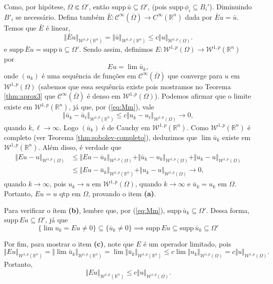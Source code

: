 \documentclass[a4paper, 11pt]{book}
\theoremstyle{definition}
\newcommand{\bR}{\mathbb{R}}
\newcommand{\cC}{\mathcal{C}}
\newcommand{\cW}{\mathcal{W}}
\newcommand{\supp}{\mathrm{supp}\,}
\begin{document}
\begin{prf}
    Como, por hipótese, $\Omega \Subset \Omega'$, então $\supp \bar u \subseteq \Omega'$, (pois $\supp \phi_i \subseteq B_i'$). Diminuindo $B'_i$ se necessário.
    Defina também $\bar E: \cC^\infty(\overline\Omega) \to C^\infty(\bR^n)$ dada por $\bar E u = \bar u$.
    Temos que $\bar E$ é linear,
    \[
        \Vert \bar E u \Vert_{\cW^{1,p}(\bR^n)} = \Vert \bar u \Vert_{\cW^{1,p}(\bR^n)} \leqslant c \Vert u \Vert_{\cW^{1,p}(\Omega)}.
    \]
    e $\supp \bar E u  = \supp \bar u \subseteq \Omega'.$
    Sendo assim, definimos $E : \cW^{1,p}(\Omega) \to \cW^{1,p}(\bR^n)$ por
    \[
        Eu = \lim \bar u_k,
    \]
    onde $(u_k)$ é uma sequência de funções em $\cC^\infty(\overline\Omega)$ que converge para $u$ em $\cW^{1,p}(\Omega)$ (sabemos que essa sequência existe pois mostramos no Teorema \ref{thm:aprox3} que $\cC^\infty(\overline\Omega)$ é denso em $\cW^{1,p}(\Omega)$).
    Podemos afirmar que o limite existe em $\cW^{1,p}(\bR^n)$, já que, por (\ref{eq:Mm}), vale
    \[
        \Vert \bar u_k - \bar u_\ell \Vert_{\cW^{1,p}(\bR^n)} \leqslant c \Vert u_k - u_\ell \Vert_{\cW^{1,p}(\Omega)} \to 0,
    \]
    quando $k,\ell \to \infty$.
    Logo $(\bar u_k)$ é de Cauchy em $\cW^{1,p}(\bR^n)$.
    Como $\cW^{1,p}(\bR^n)$ é completo (ver Teorema \ref{thm:sobolev-completo}), deduzimos que $\lim \bar u_k$ existe em $\cW^{1,p}(\bR^n)$.
    Além disso, é verdade que
    \[
        \begin{aligned}
            \Vert Eu - u \Vert_{\cW^{1,p}(\Omega)} &\leqslant \Vert Eu - \bar u_k \Vert_{\cW^{1,p}(\Omega)} + \Vert \bar u_k - u_k \Vert_{\cW^{1,p}(\Omega)} + \Vert u_k - u\Vert_{\cW^{1,p}(\Omega)}\\
            &\leqslant \Vert Eu - \bar u_k \Vert_{\cW^{1,p}(\bR^n)} + \Vert u_k - u \Vert_{\cW^{1,p}(\Omega)} \to 0,
        \end{aligned}
    \]
    quando $k \to \infty$,
    pois $u_k \to u$ em $\cW^{1,p}(\Omega)$, quando $k \to \infty$ e $\bar u_k = u_k$ em $\Omega$.
    Portanto, $Eu = u$ qtp em $\Omega$, provando o item \textbf{(a)}.

    Para verificar o ítem \textbf{(b)}, lembre que, por (\ref{eq:Mm}), $\supp \bar u_k \subseteq \Omega'$.
    Dessa forma, $\supp Eu \subseteq \Omega'$, já que
    \[
        \{ \lim u_k = Eu \neq 0\} \subseteq \{ \bar u_k \neq 0 \} \implies \supp Eu \subseteq \supp \bar u_k \subseteq \Omega'
    \]

    Por fim, para mostrar o item \textbf{(c)}, note que $E$ é um operador limitado, pois
    \[
        \Vert Eu \Vert_{\cW^{1,p}(\bR^n)} = \Vert \lim \bar u_k \Vert_{\cW^{1,p}(\bR^n)} = \lim \Vert \bar u_k \Vert_{\cW^{1,p}(\bR^n)} \leqslant c \lim \Vert u_k \Vert_{\cW^{1,p}(\Omega)} = c \Vert u \Vert_{\cW^{1,p}(\Omega)}.
    \]
    Portanto,
    \[
        \Vert Eu \Vert_{\cW^{1,p}(\bR^n)} \leqslant c \Vert u \Vert_{\cW^{1,p}(\Omega)}.
    \]
\end{prf}
\end{document}
